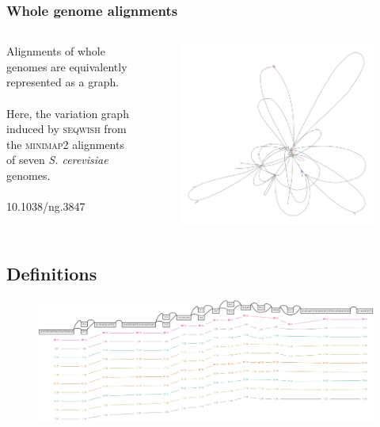 \documentclass{beamer}
\begin{document}
\begin{frame}
  \frametitle{Whole genome alignments}
  \begin{columns}[c] %

    Alignments of whole genomes are equivalently represented as a graph.
    \\~\\
    Here, the variation graph induced by \textsc{seqwish} from the  \textsc{minimap2} alignments of seven \emph{S. cerevisiae} genomes.
    \\~\\
    10.1038/ng.3847

    \begin{figure}
      \includegraphics[scale=0.145,center]{seqwish_yeast.png}
    \end{figure}
  \end{columns}
\end{frame}


\subsection{Definitions}

\begin{frame}
  \begin{figure}
    \includegraphics[scale=0.3,center]{H_3136.pdf}
  \end{figure}
\end{frame}
\end{document}
